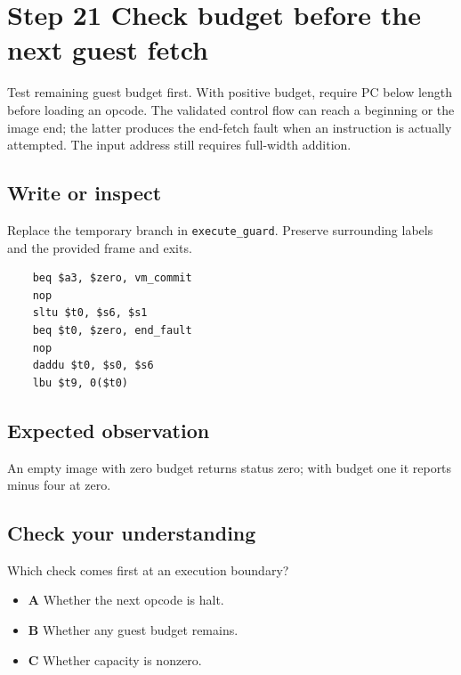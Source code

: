 \section{Step 21 Check budget before the next guest fetch}\label{vm-s21}

Test remaining guest budget first. With positive budget, require PC below length before loading an opcode. The validated control flow can reach a beginning or the image end; the latter produces the end-fetch fault when an instruction is actually attempted. The input address still requires full-width addition.

\subsection{Write or inspect}
Replace the temporary branch in \texttt{execute\_guard}. Preserve surrounding labels and the provided frame and exits.

\begin{verbatim}
    beq $a3, $zero, vm_commit
    nop
    sltu $t0, $s6, $s1
    beq $t0, $zero, end_fault
    nop
    daddu $t0, $s0, $s6
    lbu $t9, 0($t0)
\end{verbatim}
\subsection{Expected observation}
An empty image with zero budget returns status zero; with budget one it reports minus four at zero.

\subsection{Check your understanding}
Which check comes first at an execution boundary?

\begin{itemize}
  \item \textbf{A} Whether the next opcode is halt.
  \item \textbf{B} Whether any guest budget remains.
  \item \textbf{C} Whether capacity is nonzero.
\end{itemize}
